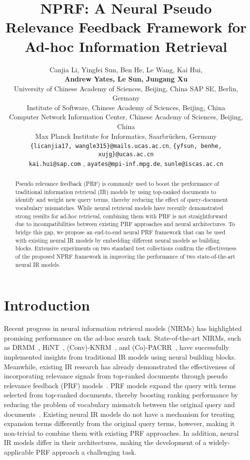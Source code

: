\documentclass[11pt,a4paper]{article}
\title{NPRF: A Neural Pseudo Relevance Feedback Framework for Ad-hoc Information Retrieval}
\author{Canjia Li, Yingfei Sun, Ben He\textsuperscript{\Letter}, Le Wang, Kai Hui,\\ 
	\textbf{Andrew Yates, Le Sun, Jungang Xu} \\
	 University of Chinese Academy of Sciences, Beijing, China \hspace{0.1cm}  SAP SE, Berlin, Germany\\ 
	 Institute of Software, Chinese Academy of Sciences, Beijing, China\\
     Computer Network Information Center, Chinese Academy of Sciences, Beijing, China\\
     Max Planck Institute for Informatics, Saarbr\"ucken, Germany \\
\small {\tt \{licanjia17, wangle315\}@mails.ucas.ac.cn}, \hspace{0.15cm}  {\tt \{yfsun, benhe\textsuperscript{\Letter}, xujg\}@ucas.ac.cn}  \\ 
\small  {\tt kai.hui@sap.com} , \hspace{0.15cm} {\tt ayates@mpi-inf.mpg.de}, \hspace{0.15cm} {\tt sunle@iscas.ac.cn}
}
\begin{document}
\maketitle
\begin{abstract}
Pseudo relevance feedback (PRF) is commonly used to boost the performance of traditional information retrieval (IR) models by using top-ranked documents to identify and weight new query terms, thereby reducing the effect of query-document vocabulary mismatches. While neural retrieval models have recently demonstrated strong results for ad-hoc retrieval, combining them with PRF is not straightforward due to incompatibilities between existing PRF approaches and neural architectures. To bridge this gap, we propose an end-to-end neural PRF framework that can be used with existing neural IR models by embedding different neural models as building blocks. Extensive experiments on two standard test collections confirm the effectiveness of the proposed NPRF framework in improving the performance of two state-of-the-art neural IR models.
\end{abstract}

\def \vignore {0mm}

\vspace{\vignore}
\section{Introduction}\label{sec:Introduction}
\vspace{\vignore}

Recent progress in neural information retrieval models (NIRMs) has highlighted promising performance
on the ad-hoc search task. State-of-the-art NIRMs, such as DRMM~\cite{DBLP:conf/cikm/GuoFAC16}, HiNT~\cite{DBLP:conf/sigir/FanGLXZC18},
(Conv)-KNRM~\cite{DBLP:conf/sigir/XiongDCLP17,DBLP:conf/wsdm/DaiXC018},
and (Co)-PACRR~\cite{DBLP:conf/emnlp/HuiYBM17,DBLP:conf/wsdm/HuiYBM18}, 
have successfully implemented insights from  traditional IR models using  
neural building blocks.
Meanwhile, 
existing IR research has already demonstrated the effectiveness of 
incorporating relevance signals from top-ranked documents through 
pseudo relevance feedback (PRF) models~\cite{buckley08rfoverview,DBLP:conf/acl/0001MC16}.
PRF models expand the query with terms selected from top-ranked documents, thereby
boosting ranking performance by reducing the problem of vocabulary mismatch between the original query and documents~\cite{rocchio1971relevance}.
Existing neural IR models do not have a mechanism for treating expansion terms differently from the original query terms, however, making it non-trivial to combine them with existing PRF approaches.
In addition, 
neural IR models differ in their architectures, 
making the development of 
a widely-applicable PRF approach a challenging task.
\end{document}
